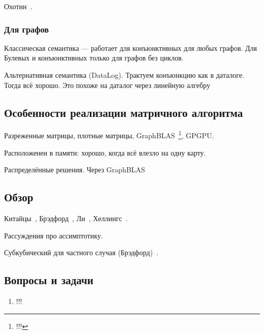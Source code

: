 Охотин~\cite{!!!}.

\subsubsection{Для графов}

Классическая семантика --- работает для конъюнктивных для любых графов.
Для Булевых и конъюнктивных только для графов без циклов.

Альтернативная семантика (DataLog).
Трактуем конъюнкцию как в даталоге. Тогда всё хорошо.
Это похоже на даталог через линейную алгебру~\cite{!!!}

\subsection{Особенности реализации матричного алгоритма}

Разреженные матрицы, плотные матрицы, GraphBLAS~\footnote{!!!}, GPGPU.

Расположенеи в памяти: хорошо, когда всё влезло на одну карту.

Распределённые решения. 
Через GraphBLAS

\subsection{Обзор}

Китайцы~\cite{!!!}, Брэдфорд~\cite{!!!}, Ли~\cite{!!!}, Хеллингс~\cite{!!!}.

Рассуждения про ассимптотику.

Субкубический для частного случая (Брэдфорд)~\cite{!!!}.

\subsection{Вопросы и задачи}
\begin{enumerate}
  \item !!!
\end{enumerate}
